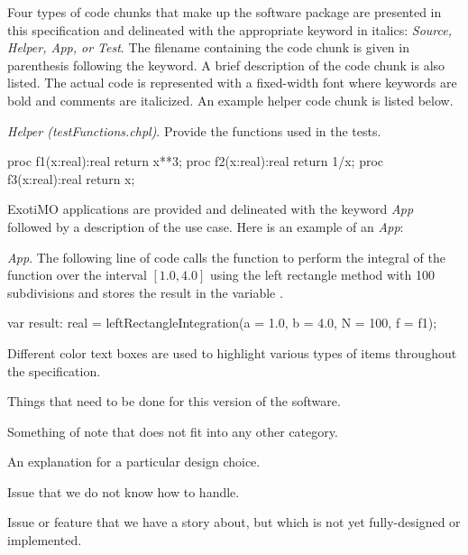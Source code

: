 \label{Notation}

Four types of code chunks that make up the software package are 
presented in this specification and delineated
with the appropriate keyword in italics: 
\textit{Source, Helper, App, or Test}.  The filename containing the code
chunk is given in parenthesis following the keyword. A brief description 
of the code chunk is also listed.
The actual code is represented with a fixed-width font where keywords are
bold and comments are italicized. An example helper code chunk is listed
below.

\textit{Helper (testFunctions.chpl)}. Provide the functions used
in the tests.
\begin{chapel}
  proc f1(x:real):real {
    return x**3;
  } 
  proc f2(x:real):real {
    return 1/x;
  } 
  proc f3(x:real):real {
    return x;
  } 
\end{chapel}

ExotiMO applications are provided and delineated with the
keyword \textit{App} followed by a description of the use case. Here is
an example of an \textit{App}:

\textit{App}. The following line of code calls the function
 to perform the integral of the function 
over the interval $[1.0,4.0]$ using the left rectangle method with 100 subdivisions
and stores the result in the variable .
\begin{chapel}
  var result: real = leftRectangleIntegration(a = 1.0, b = 4.0, N = 100, f = f1);
\end{chapel}

Different color text boxes are used to highlight various types of items 
throughout the specification.

\begin{TODO}
  Things that need to be done for this version of the software.
\end{TODO}

\begin{note}
  Something of note that does not fit into any other category.
\end{note}

\begin{rationale}
  An explanation for a particular design choice.
\end{rationale}

\begin{openissue}
  Issue that we do not know how to handle.
\end{openissue}

\clearpage
\begin{future}
  Issue or feature that we have a story about, but which is not yet
  fully-designed or implemented. 
\end{future}
